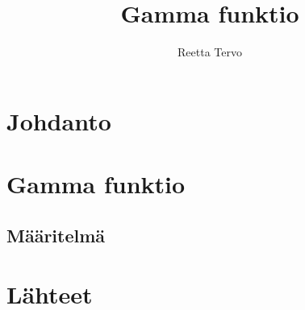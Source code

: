 \documentclass{article}
\title{Gamma funktio}
\author{Reetta Tervo}
\begin{document}
\maketitle

\newpage
\setcounter{tocdepth}{1}
\tableofcontents

\newpage
\section{Johdanto}
\newpage
\section{Gamma funktio}\label{luk: gammafunktio}
\newpage
\subsection{Määritelmä} \label{luk: määritelmä}
\newpage
\section{Lähteet}
\end{document}
